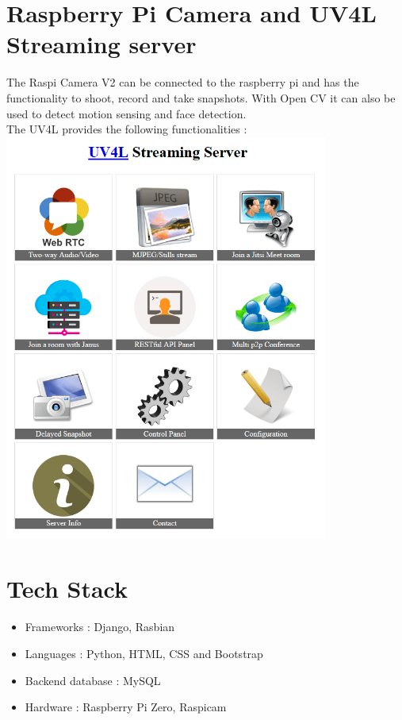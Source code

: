 \section{Raspberry Pi Camera and UV4L Streaming server}
{\normalsize The Raspi Camera V2 can be connected to the raspberry pi and has the functionality to shoot, record and take snapshots. With Open CV it can also be used to detect motion sensing and face detection. \\[0.1in]
The UV4L provides the following functionalities :\\
\includegraphics[width=0.8\textwidth]{uv4l_server_main.png}\\[0.1in]
}
\section{Tech Stack}
{\normalsize 
\begin{itemize}
    \item Frameworks : Django, Rasbian
    \item Languages : Python, HTML, CSS and Bootstrap 
    \item Backend database : MySQL
    \item Hardware : Raspberry Pi Zero, Raspicam
\end{itemize}
}





